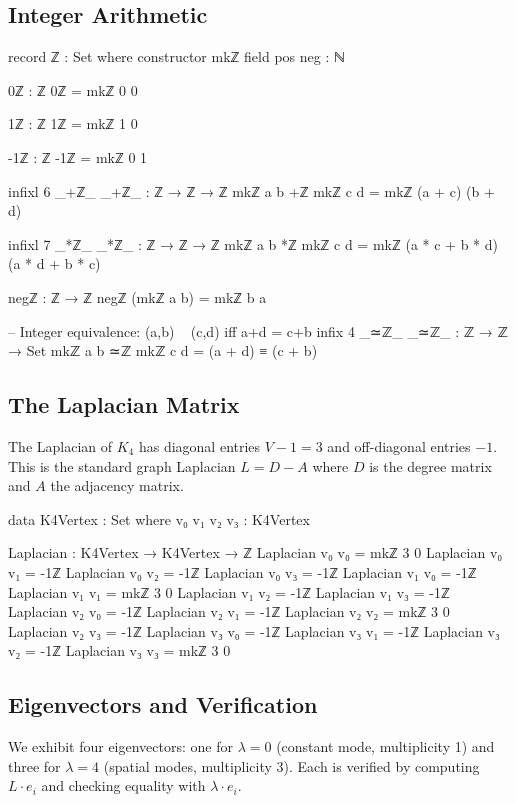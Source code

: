 \documentclass[11pt,a4paper]{article}
\begin{document}
\subsection{Integer Arithmetic}

\begin{code}
record ℤ : Set where
  constructor mkℤ
  field pos neg : ℕ

0ℤ : ℤ
0ℤ = mkℤ 0 0

1ℤ : ℤ
1ℤ = mkℤ 1 0

-1ℤ : ℤ
-1ℤ = mkℤ 0 1

infixl 6 _+ℤ_
_+ℤ_ : ℤ → ℤ → ℤ
mkℤ a b +ℤ mkℤ c d = mkℤ (a + c) (b + d)

infixl 7 _*ℤ_
_*ℤ_ : ℤ → ℤ → ℤ
mkℤ a b *ℤ mkℤ c d = mkℤ (a * c + b * d) (a * d + b * c)

negℤ : ℤ → ℤ
negℤ (mkℤ a b) = mkℤ b a

-- Integer equivalence: (a,b) ~ (c,d) iff a+d = c+b
infix 4 _≃ℤ_
_≃ℤ_ : ℤ → ℤ → Set
mkℤ a b ≃ℤ mkℤ c d = (a + d) ≡ (c + b)
\end{code}

\subsection{The Laplacian Matrix}

The Laplacian of $K_4$ has diagonal entries $V - 1 = 3$ and
off-diagonal entries $-1$. This is the standard graph Laplacian
$L = D - A$ where $D$ is the degree matrix and $A$ the adjacency matrix.

\begin{code}
data K4Vertex : Set where
  v₀ v₁ v₂ v₃ : K4Vertex

Laplacian : K4Vertex → K4Vertex → ℤ
Laplacian v₀ v₀ = mkℤ 3 0
Laplacian v₀ v₁ = -1ℤ
Laplacian v₀ v₂ = -1ℤ
Laplacian v₀ v₃ = -1ℤ
Laplacian v₁ v₀ = -1ℤ
Laplacian v₁ v₁ = mkℤ 3 0
Laplacian v₁ v₂ = -1ℤ
Laplacian v₁ v₃ = -1ℤ
Laplacian v₂ v₀ = -1ℤ
Laplacian v₂ v₁ = -1ℤ
Laplacian v₂ v₂ = mkℤ 3 0
Laplacian v₂ v₃ = -1ℤ
Laplacian v₃ v₀ = -1ℤ
Laplacian v₃ v₁ = -1ℤ
Laplacian v₃ v₂ = -1ℤ
Laplacian v₃ v₃ = mkℤ 3 0
\end{code}

\subsection{Eigenvectors and Verification}

We exhibit four eigenvectors: one for $\lambda = 0$ (constant mode,
multiplicity 1) and three for $\lambda = 4$ (spatial modes,
multiplicity 3). Each is verified by computing $L \cdot e_i$ and
checking equality with $\lambda \cdot e_i$.
\end{document}
